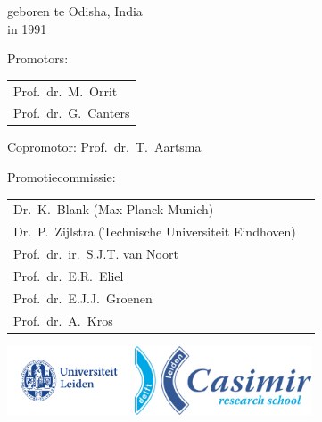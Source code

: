 \begin{titlepage}
\begin{center}
\bigskip
\bigskip


geboren te Odisha, India \\
in 1991

\vspace*{2\bigskipamount}

\end{center}

\clearpage
\thispagestyle{empty}

\noindent Promotors:

\medskip\noindent
\begin{tabular}{l}
    Prof.\ dr.\ M.\ Orrit \\
    Prof.\ dr.\ G.\ Canters
\end{tabular}

\medskip
\noindent Copromotor: Prof.\ dr.\ T.\ Aartsma

\medskip
\noindent Promotiecommissie:

\medskip\noindent
\begin{tabular}{ll}
    Dr.\ K.\ Blank (Max Planck Munich) \\
    Dr.\ P.\ Zijlstra (Technische Universiteit Eindhoven) \\
    Prof.\ dr.\ ir.\ S.J.T. van Noort \\
    Prof.\ dr.\ E.R.\ Eliel \\
    Prof.\ dr.\ E.J.J.\ Groenen \\
    Prof.\ dr.\ A.\ Kros \\
\end{tabular}


\vfill
\begin{center}
    \includegraphics[height=0.8in]{frontback/logos/leiden}
    \hspace{2em}
    \includegraphics[height=0.8in]{frontback/logos/casimir} \\
\end{center}
\vfill


\end{titlepage}
